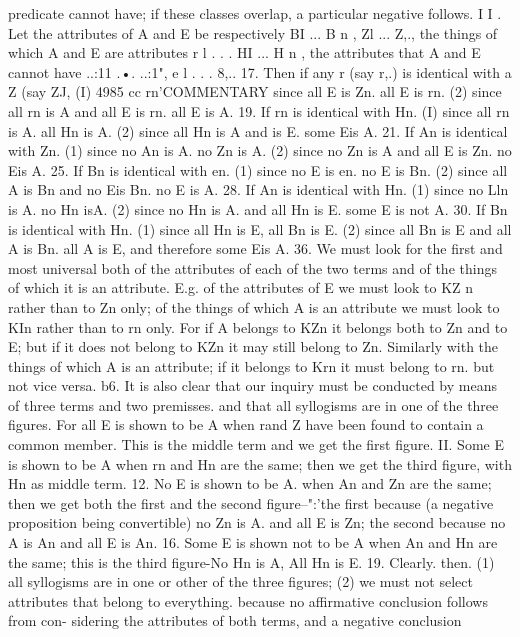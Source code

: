 {{{{{{{{{{{{{{{{{{{predicate cannot have; if these classes overlap, a particular
negative follows.
I I . Let the attributes of A and E be respectively BI ... B n ,
Zl ... Z,., the things of which A and E are attributes r l . . .
HI ... H n , the attributes that A and E cannot have ..:11 .•. ..:1",
e l . . . 8,..
17. Then if any r (say r,.) is identical with a Z (say ZJ, (I)
4985
cc
rn'COMMENTARY
since all E is Zn. all E is rn. (2) since all rn is A and all E is rn.
all E is A.
19. If rn is identical with Hn. (I) since all rn is A. all Hn is A.
(2) since all Hn is A and is E. some Eis A.
21. If An is identical with Zn. (1) since no An is A. no Zn is A.
(2) since no Zn is A and all E is Zn. no Eis A.
25. If Bn is identical with en. (1) since no E is en. no E is Bn.
(2) since all A is Bn and no Eis Bn. no E is A.
28. If An is identical with Hn. (1) since no Lln is A. no Hn isA.
(2) since no Hn is A. and all Hn is E. some E is not A.
30. If Bn is identical with Hn. (1) since all Hn is E, all Bn is E.
(2) since all Bn is E and all A is Bn. all A is E, and therefore some
Eis A.
36. We must look for the first and most universal both of the
attributes of each of the two terms and of the things of which it is
an attribute. E.g. of the attributes of E we must look to KZ n
rather than to Zn only; of the things of which A is an attribute
we must look to KIn rather than to rn only. For if A belongs to
KZn it belongs both to Zn and to E; but if it does not belong to
KZn it may still belong to Zn. Similarly with the things of which
A is an attribute; if it belongs to Krn it must belong to rn. but
not vice versa.
b6. It is also clear that our inquiry must be conducted by means
of three terms and two premisses. and that all syllogisms are in
one of the three figures. For all E is shown to be A when rand Z
have been found to contain a common member. This is the
middle term and we get the first figure.
II. Some E is shown to be A when rn and Hn are the same;
then we get the third figure, with Hn as middle term.
12. No E is shown to be A. when An and Zn are the same; then
we get both the first and the second figure--":'the first because (a
negative proposition being convertible) no Zn is A. and all E is
Zn; the second because no A is An and all E is An.
16. Some E is shown not to be A when An and Hn are the same;
this is the third figure-No Hn is A, All Hn is E.
19. Clearly. then. (1) all syllogisms are in one or other of the
three figures; (2) we must not select attributes that belong to
everything. because no affirmative conclusion follows from con-
sidering the attributes of both terms, and a negative conclusion
}}}}}}}}}}}}}}}}}}}
